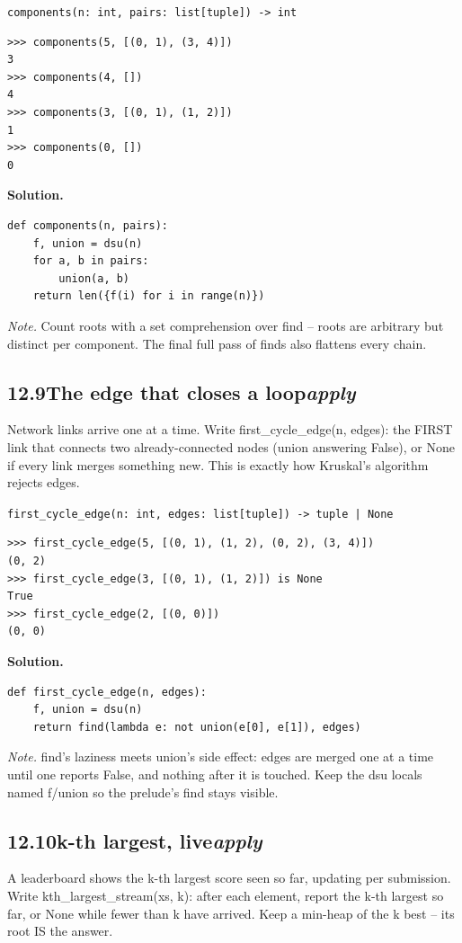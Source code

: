 \documentclass[10pt,letterpaper]{book}
\begin{document}
\noindent\texttt{components(n: int, pairs: list[tuple]) -> int}
\begin{lstlisting}[style=ex]
>>> components(5, [(0, 1), (3, 4)])
3
>>> components(4, [])
4
>>> components(3, [(0, 1), (1, 2)])
1
>>> components(0, [])
0
\end{lstlisting}
\noindent\textbf{Solution.}
\begin{lstlisting}[style=code]
def components(n, pairs):
    f, union = dsu(n)
    for a, b in pairs:
        union(a, b)
    return len({f(i) for i in range(n)})
\end{lstlisting}
\noindent\textit{Note.} Count roots with a set comprehension over find -- roots are arbitrary but distinct per component. The final full pass of finds also flattens every chain.

\subsection*{12.9\quad The edge that closes a loop\hfill\textnormal{\textit{apply}}}
Network links arrive one at a time. Write first\_cycle\_edge(n, edges): the FIRST link that connects two already-connected nodes (union answering False), or None if every link merges something new. This is exactly how Kruskal's algorithm rejects edges.

\noindent\texttt{first\_cycle\_edge(n: int, edges: list[tuple]) -> tuple | None}
\begin{lstlisting}[style=ex]
>>> first_cycle_edge(5, [(0, 1), (1, 2), (0, 2), (3, 4)])
(0, 2)
>>> first_cycle_edge(3, [(0, 1), (1, 2)]) is None
True
>>> first_cycle_edge(2, [(0, 0)])
(0, 0)
\end{lstlisting}
\noindent\textbf{Solution.}
\begin{lstlisting}[style=code]
def first_cycle_edge(n, edges):
    f, union = dsu(n)
    return find(lambda e: not union(e[0], e[1]), edges)
\end{lstlisting}
\noindent\textit{Note.} find's laziness meets union's side effect: edges are merged one at a time until one reports False, and nothing after it is touched. Keep the dsu locals named f/union so the prelude's find stays visible.

\subsection*{12.10\quad k-th largest, live\hfill\textnormal{\textit{apply}}}
A leaderboard shows the k-th largest score seen so far, updating per submission. Write kth\_largest\_stream(xs, k): after each element, report the k-th largest so far, or None while fewer than k have arrived. Keep a min-heap of the k best -- its root IS the answer.
\end{document}
